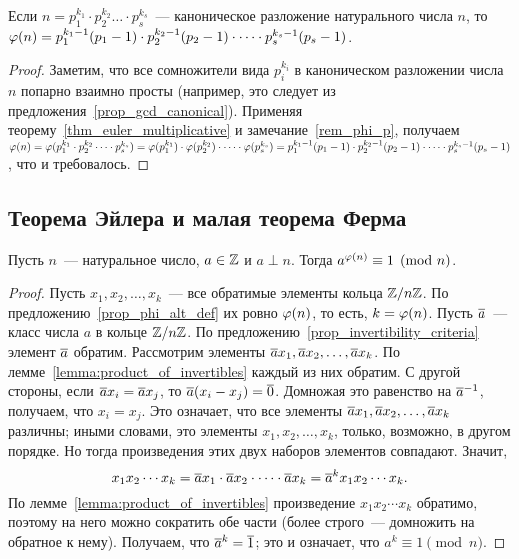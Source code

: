\begin{corollary}
Если $n=p_1^{k_1}\cdot p_2^{k_2}\dots\cdot p_s^{k_s}$~--- каноническое
разложение натурального числа $n$, то $\varphi(n)=p_1^{k_1-1}(p_1-1)\cdot
p_2^{k_2-1}(p_2-1)\cdot\dots\cdot p_s^{k_s-1}(p_s-1)$.
\end{corollary}
\begin{proof}
Заметим, что все сомножители вида $p_i^{k_i}$ в каноническом
разложении числа $n$ попарно взаимно просты (например, это следует из
предложения~\ref{prop_gcd_canonical}). Применяя
теорему~\ref{thm_euler_multiplicative} и замечание~\ref{rem_phi_p},
получаем $\varphi(n)=\varphi(p_1^{k_1}\cdot p_2^{k_2}\dots\cdot
p_s^{k_s})=\varphi(p_1^{k_1})\cdot
\varphi(p_2^{k_2})\cdot\dots\cdot\varphi(p_s^{k_s})=p_1^{k_1-1}(p_1-1)\cdot
p_2^{k_2-1}(p_2-1)\cdot\dots\cdot p_s^{k_s-1}(p_s-1)$, что и требовалось.
\end{proof}

\subsection{Теорема Эйлера и малая теорема Ферма}


\begin{theorem}\label{thm:euler}
Пусть $n$~--- натуральное число, $a\in\mathbb Z$ и $a\perp n$. Тогда
$a^{\varphi(n)}\equiv 1\pmod n$.
\end{theorem}
\begin{proof}
Пусть $x_1,x_2,\dots,x_k$~--- все обратимые элементы кольца $\mathbb
Z/n\mathbb Z$. По предложению~\ref{prop_phi_alt_def} их ровно $\varphi(n)$, то
есть, $k=\varphi(n)$. Пусть $\overline{a}$~--- класс числа $a$ в кольце $\mathbb
Z/n\mathbb Z$. По предложению~\ref{prop_invertibility_criteria} элемент
$\overline{a}$ обратим. Рассмотрим элементы
$\overline{a}x_1,\overline{a}x_2,\dots,\overline{a}x_k$. По
лемме~\ref{lemma:product_of_invertibles} каждый из них обратим. С
другой стороны, если $\overline{a}x_i=\overline{a}x_j$, то
$\overline{a}(x_i-x_j)=\overline{0}$. Домножая это равенство на $\overline{a}^{-1}$,
получаем, что $x_i=x_j$. Это означает, что все элементы
$\overline{a}x_1,\overline{a}x_2,\dots,\overline{a}x_k$ различны; иными словами, это
элементы $x_1,x_2,\dots,x_k$, только, возможно, в другом порядке. Но
тогда произведения этих двух наборов элементов совпадают. Значит,
$$
x_1x_2\cdots
x_k=\overline{a}x_1\cdot\overline{a}x_2\cdot\cdots\cdot\overline{a}x_k=\overline{a}^kx_1x_2\cdots x_k.
$$
По
лемме~\ref{lemma:product_of_invertibles} произведение $x_1x_2\cdots
x_k$ обратимо, поэтому на него можно сократить обе части (более
строго~--- домножить на обратное к нему). Получаем, что
$\overline{a}^k=\overline{1}$; это и означает, что $a^k\equiv 1\pmod{n}$.
\end{proof}

